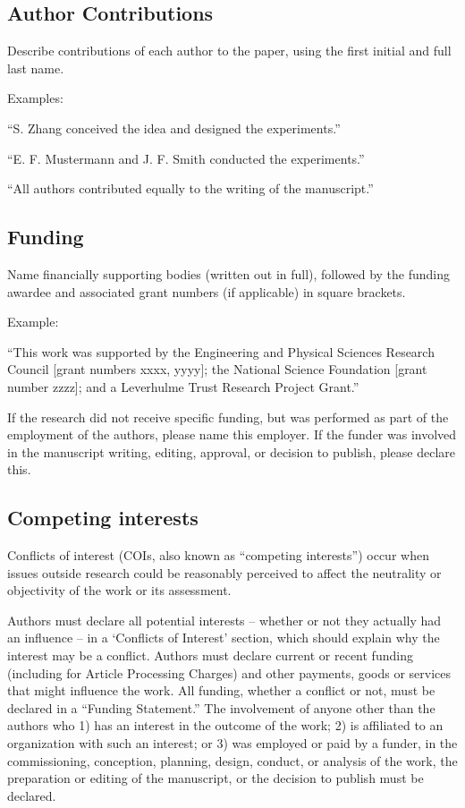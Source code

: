 \documentclass{article}
\begin{document}
\subsection*{Author Contributions} 
Describe contributions of each author to the paper, using the first initial and full last name. 

\medskip Examples:

``S. Zhang conceived the idea and designed the experiments.''

``E. F. Mustermann and J. F. Smith conducted the experiments.''

``All authors contributed equally to the writing of the manuscript.''

\subsection*{Funding}
Name financially supporting bodies (written out in full), followed by the funding awardee and associated grant numbers (if applicable) in square brackets. 

\medskip Example: 

``This work was supported by the Engineering and Physical Sciences Research Council [grant numbers xxxx, yyyy]; the National Science Foundation [grant number zzzz]; and a Leverhulme Trust Research Project Grant.'' 

\medskip
If the research did not receive specific funding, but was performed as part of the employment of the authors, please name this employer. If the funder was involved in the manuscript writing, editing, approval, or decision to publish, please declare this.

\subsection*{Competing interests}
Conflicts of interest (COIs, also known as ``competing interests'') occur when issues outside research could be reasonably perceived to affect the neutrality or objectivity of the work or its assessment. 

Authors must declare all potential interests – whether or not they actually had an influence – in a ‘Conflicts of Interest’ section, which should explain why the interest may be a conflict. Authors must declare current or recent funding (including for Article Processing Charges) and other payments, goods or services that might influence the work. All funding, whether a conflict or not, must be declared in a ``Funding Statement.'' The involvement of anyone other than the authors who 1) has an interest in the outcome of the work; 2) is affiliated to an organization with such an interest; or 3) was employed or paid by a funder, in the commissioning, conception, planning, design, conduct, or analysis of the work, the preparation or editing of the manuscript, or the decision to publish must be declared.
\end{document}
